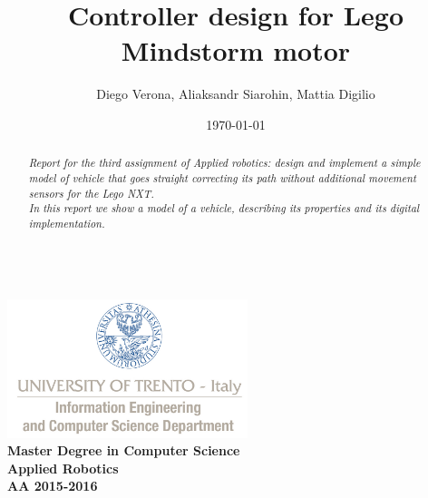 \documentclass[a4paper,12pt,oneside]{article}
\title{Controller design for Lego Mindstorm motor}
\author{Diego Verona, Aliaksandr Siarohin, Mattia Digilio}
\date{\today}
\begin{document}
\makeatletter  %
\begin{titlepage}
      \centering
      ~~~~~~~~~~~~~\\[-30mm]
      \includegraphics[keepaspectratio=true, width=7cm]{bg_eng_1r.jpg} \\[10mm]

     {
     \large \bfseries Master Degree in Computer Science\\[3mm] 
     Applied Robotics\\[3mm]
     AA 2015-2016
     }\\[10mm]


     \vspace{0.5cm}
     {
     \Large \bfseries \textcolor{blue}{\@title} \par
     }
     \vspace{0.5cm}
     \vspace{0.2cm}

     {\large {\@author}}
     \\ \vspace{.2cm}
     \@date

     \vspace{0.6cm}


\begin{abstract}

\textit{
  Report for the third assignment of Applied robotics: design and implement a simple model of vehicle that goes straight correcting its path without additional movement sensors for the Lego NXT.\\In this report we show a model of a vehicle, describing its properties and its digital implementation.
}


\end{abstract}

\end{titlepage}
\end{document}

